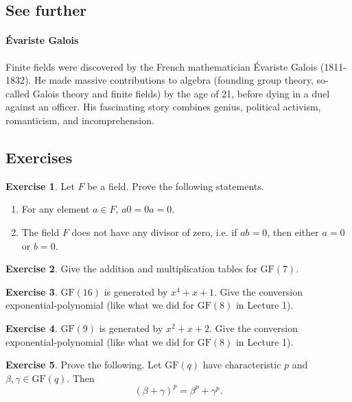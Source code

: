\documentclass[a4paper, 11pt, openany]{book}
\numberwithin{equation}{section}
\theoremstyle{plain}
\theoremstyle{definition}
\newtheorem{exercise}   {Exercise}  [section]
\newcommand{\GF}{\mathrm{GF}}
\begin{document}
\subsection{See further}

\paragraph{\'{E}variste Galois}
Finite fields were discovered by the French mathematician \'{E}variste Galois (1811-1832). He made massive contributions to algebra (founding group theory, so-called Galois theory and finite fields) by the age of 21, before dying in a duel against an officer. His fascinating story combines genius, political activism, romanticism, and incomprehension.


\subsection{Exercises}

\begin{exercise}
Let $F$ be a field. Prove the following statements.
\begin{enumerate}
    \item For any element $a \in F$, $a0 = 0a = 0$.
    
    \item The field $F$ does not have any divisor of zero, i.e. if $ab = 0$, then either $a=0$ or $b=0$.
\end{enumerate}
\end{exercise}

\begin{exercise}
Give the addition and multiplication tables for $\GF(7)$.
\end{exercise}

\begin{exercise}
$\GF(16)$ is generated by $x^4 + x + 1$. Give the conversion exponential-polynomial (like what we did for $\GF(8)$ in Lecture 1).
\end{exercise}


\begin{exercise}
$\GF(9)$ is generated by $x^2 + x + 2$. Give the conversion exponential-polynomial (like what we did for $\GF(8)$ in Lecture 1).
\end{exercise}



\begin{exercise}
Prove the following. Let $\GF(q)$ have characteristic $p$ and $\beta, \gamma \in \GF(q)$. Then
\[
	(\beta + \gamma)^p = \beta^p + \gamma^p.
\]
\end{exercise}
\end{document}

